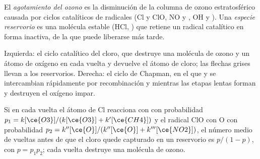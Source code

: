 \begin{definition}\label{def:b3:photochemistry:ozone-depletion}
El \emph{agotamiento del ozono} es la disminución de la
columna de ozono estratosférico causada por ciclos catalíticos de radicales (Cl y ClO,
NO y , OH y ). Una \emph{especie reservorio}
es una molécula estable (HCl, ) que retiene un radical catalítico en forma
inactiva, de la que puede liberarse más tarde.
\end{definition}

\begin{omfigure}

{\small Izquierda: el ciclo catalítico del cloro, que destruye una molécula de ozono y
un átomo de oxígeno en cada vuelta y devuelve el átomo de cloro; las flechas grises llevan
a los reservorios. Derecha: el ciclo de Chapman, en el que  y  se intercambian
rápidamente por recombinación y  mientras las etapas lentas forman y destruyen
el oxígeno impar.}
\end{omfigure}

\begin{proposition}\label{prop:b3:photochemistry:catalytic-destruction}
Si en cada vuelta el átomo de Cl reacciona con  con probabilidad $p_1 =
k[\ce{O3}]/(k[\ce{O3}] + k'[\ce{CH4}])$ y el radical ClO con O con probabilidad $p_2 =
k''[\ce{O}]/(k''[\ce{O}] + k'''[\ce{NO2}])$, el número medio de vueltas antes de que el cloro quede
capturado en un reservorio es $p/(1 - p)$, con $p = p_1p_2$; cada vuelta destruye una
molécula de ozono.
\end{proposition}

